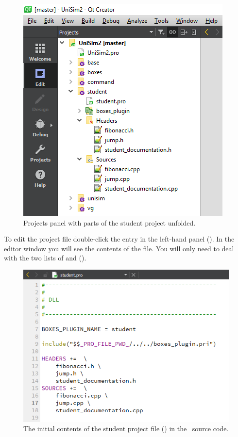 \begin{figure}
\centering
\includegraphics[scale=0.7]{graphics/qt-creator-projects-student-1}
\caption{Projects panel with parts of the student project unfolded.}
\label{fig:qt-creator-projects-student-1}
\end{figure}

To edit the  project file double-click the  entry in the left-hand panel (). In the editor window you will see the contents of the  file. You will only need to deal with the two lists of  and  ().

\begin{figure}
\centering
\includegraphics[scale=0.7]{graphics/qt-creator-project-file-1}
\caption{The initial contents of the student project file () in the \US\ source code.}
\label{fig:qt-creator-project-file-1}
\end{figure}

